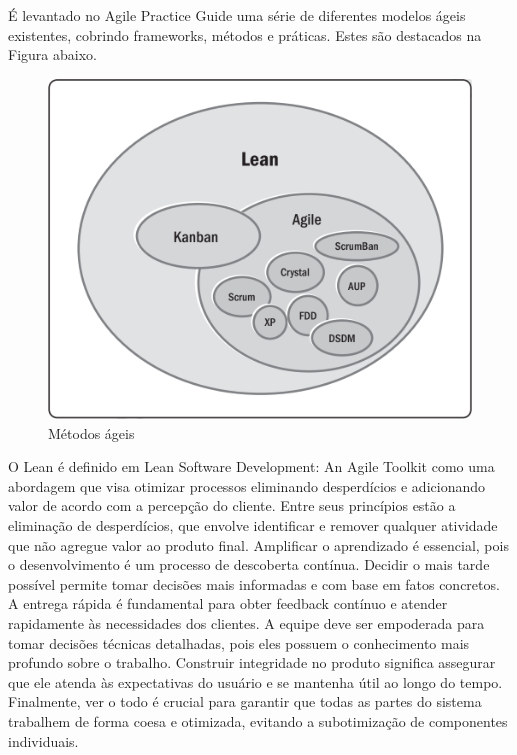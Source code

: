 \documentclass[
	12pt,
	openright,
	twoside,
	a4paper,
	english,
	brazil
	]{abntex2}
\begin{document}
É levantado no Agile Practice Guide \cite{AgileGuide} uma série de diferentes modelos ágeis existentes, cobrindo frameworks, métodos e práticas. Estes são destacados na Figura abaixo.

\begin{figure}[H]
	\caption{\label{metodos-ageis}Métodos ágeis}
  \includegraphics[width=\textwidth]{metodos-ageis}
\end{figure}

O Lean é definido em Lean Software Development: An Agile Toolkit \cite{Poppendieck_Poppendieck_2003} como uma abordagem que visa otimizar processos eliminando desperdícios e adicionando valor de acordo com a percepção do cliente. Entre seus princípios estão a eliminação de desperdícios, que envolve identificar e remover qualquer atividade que não agregue valor ao produto final. Amplificar o aprendizado é essencial, pois o desenvolvimento é um processo de descoberta contínua. Decidir o mais tarde possível permite tomar decisões mais informadas e com base em fatos concretos. A entrega rápida é fundamental para obter feedback contínuo e atender rapidamente às necessidades dos clientes. A equipe deve ser empoderada para tomar decisões técnicas detalhadas, pois eles possuem o conhecimento mais profundo sobre o trabalho. Construir integridade no produto significa assegurar que ele atenda às expectativas do usuário e se mantenha útil ao longo do tempo. Finalmente, ver o todo é crucial para garantir que todas as partes do sistema trabalhem de forma coesa e otimizada, evitando a subotimização de componentes individuais.
\end{document}

